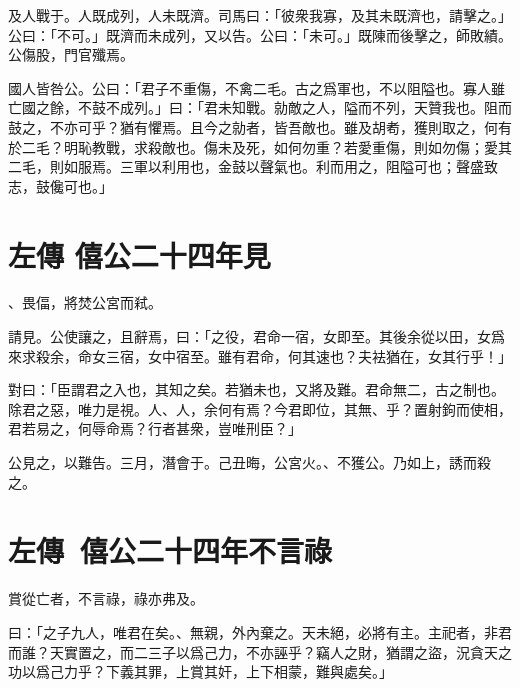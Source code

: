 及人戰于。人既成列，人未既濟。司馬曰：「彼衆我寡，及其未既濟也，請擊之。」公曰：「不可。」既濟而未成列，又以告。公曰：「未可。」既陳而後擊之，師敗績。公傷股，門官殲焉。

國人皆咎公。公曰：「君子不重傷，不禽二毛。古之爲軍也，不以阻隘也。寡人雖亡國之餘，不鼓不成列。」曰：「君未知戰。勍敵之人，隘而不列，天贊我也。阻而鼓之，不亦可乎？猶有懼焉。且今之勍者，皆吾敵也。雖及胡耇，獲則取之，何有於二毛？明恥教戰，求殺敵也。傷未及死，如何勿重？若愛重傷，則如勿傷；愛其二毛，則如服焉。三軍以利用也，金鼓以聲氣也。利而用之，阻隘可也；聲盛致志，鼓儳可也。」

\theendnotes

\section[寺人披見文公\quad{\small 左傳 僖公二十四年}]{{\normalsize 左傳 僖公二十四年}\quad {}見}
、畏偪，將焚公宮而弒。

請見。公使讓之，且辭焉，曰：「之役，君命一宿，女即至。其後余從以田，女爲來求殺余，命女三宿，女中宿至。雖有君命，何其速也？夫袪猶在，女其行乎！」

對曰：「臣謂君之入也，其知之矣。若猶未也，又將及難。君命無二，古之制也。除君之惡，唯力是視。人、人，余何有焉？今君即位，其無、乎？置射鉤而使相，君若易之，何辱命焉？行者甚衆，豈唯刑臣？」

公見之，以難告。三月，潛會于。己丑晦，公宮火。、不獲公。乃如上，誘而殺之。

\section[介之推不言祿\quad{\small 左傳\ 僖公二十四年}]{{\normalsize 左傳\ 僖公二十四年}\quad {}不言祿}
賞從亡者，不言祿，祿亦弗及。

曰：「之子九人，唯君在矣。、無親，外內棄之。天未絕，必將有主。主祀者，非君而誰？天實置之，而二三子以爲己力，不亦誣乎？竊人之財，猶謂之盜，況貪天之功以爲己力乎？下義其罪，上賞其奸，上下相蒙，難與處矣。」

